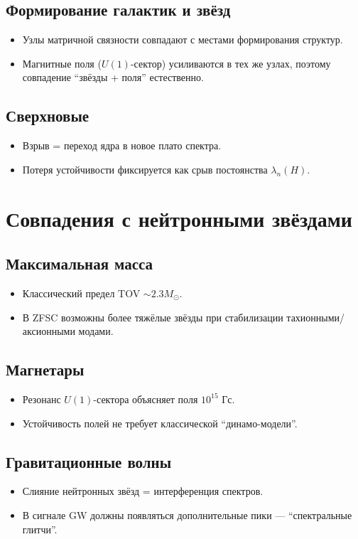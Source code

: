 \documentclass[a4paper,12pt]{article}
\begin{document}
\subsection*{Формирование галактик и звёзд}
\begin{itemize}
  \item Узлы матричной связности совпадают с местами формирования структур.
  \item Магнитные поля ($U(1)$-сектор) усиливаются в тех же узлах, поэтому совпадение ``звёзды + поля'' естественно.
\end{itemize}

\subsection*{Сверхновые}
\begin{itemize}
  \item Взрыв = переход ядра в новое плато спектра.
  \item Потеря устойчивости фиксируется как срыв постоянства $\lambda_n(H)$.
\end{itemize}

\section*{Совпадения с нейтронными звёздами}

\subsection*{Максимальная масса}
\begin{itemize}
  \item Классический предел TOV $\sim 2.3M_\odot$.
  \item В ZFSC возможны более тяжёлые звёзды при стабилизации тахионными/аксионными модами.
\end{itemize}

\subsection*{Магнетары}
\begin{itemize}
  \item Резонанс $U(1)$-сектора объясняет поля $10^{15}$ Гс.
  \item Устойчивость полей не требует классической ``динамо-модели''.
\end{itemize}

\subsection*{Гравитационные волны}
\begin{itemize}
  \item Слияние нейтронных звёзд = интерференция спектров.
  \item В сигнале GW должны появляться дополнительные пики --- ``спектральные глитчи''.
\end{itemize}
\end{document}
